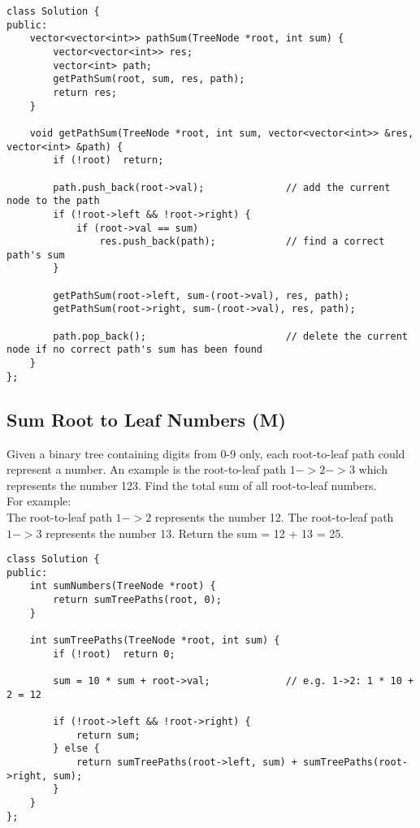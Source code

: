 \begin{lstlisting}
class Solution {
public:
    vector<vector<int>> pathSum(TreeNode *root, int sum) {
        vector<vector<int>> res;
        vector<int> path;
        getPathSum(root, sum, res, path);
        return res;
    }
    
    void getPathSum(TreeNode *root, int sum, vector<vector<int>> &res, vector<int> &path) {
        if (!root)  return;
        
        path.push_back(root->val);              // add the current node to the path
        if (!root->left && !root->right) {
            if (root->val == sum)
                res.push_back(path);            // find a correct path's sum
        }
        
        getPathSum(root->left, sum-(root->val), res, path);
        getPathSum(root->right, sum-(root->val), res, path);

        path.pop_back();                        // delete the current node if no correct path's sum has been found
    }
};
\end{lstlisting}


\subsection{Sum Root to Leaf Numbers (M)}
Given a binary tree containing digits from 0-9 only, each root-to-leaf path could represent a number. An example is the root-to-leaf path $1->2->3$ which represents the number 123. Find the total sum of all root-to-leaf numbers.\\

For example: \\
The root-to-leaf path $1->2$ represents the number 12. The root-to-leaf path $1->3$ represents the number 13. Return the sum = 12 + 13 = 25. \\

\begin{lstlisting}
class Solution {
public:
    int sumNumbers(TreeNode *root) {
        return sumTreePaths(root, 0);
    }
    
    int sumTreePaths(TreeNode *root, int sum) {
        if (!root)  return 0;
        
        sum = 10 * sum + root->val;             // e.g. 1->2: 1 * 10 + 2 = 12
        
        if (!root->left && !root->right) {
            return sum;
        } else {
            return sumTreePaths(root->left, sum) + sumTreePaths(root->right, sum);
        }
    }
};
\end{lstlisting}


